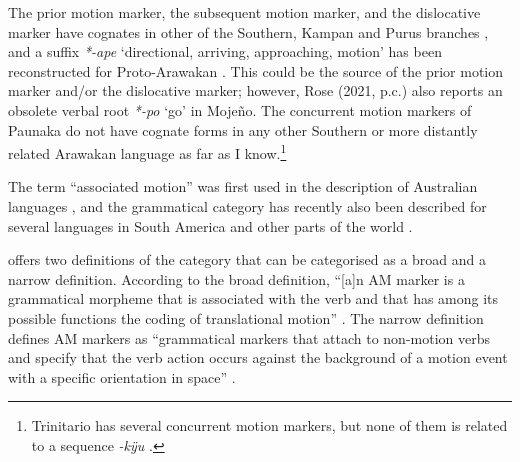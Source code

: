 \largerpage
The prior motion marker, the subsequent motion marker, and the dislocative marker have cognates in other  of the Southern, Kampan and Purus branches \citep[cf.][131--138 for an overview]{Guillaume2016}, and a suffix \mbox{\textit{*-ape}} ‘directional, arriving, approaching, motion’ has been reconstructed for Proto-Arawakan \citep[cf.][380]{Payne1991}. This could be the source of the prior motion marker and/or the dislocative marker; however, Rose (2021, p.c.) also reports an obsolete verbal root \textit{*-po} ‘go’ in Mojeño. The concurrent motion markers of Paunaka do not have cognate forms in any other Southern or more distantly related Arawakan language as far as I know.\footnote{Trinitario has several concurrent motion markers, but none of them is related to a sequence \textit{-kÿu} \citep[cf.][135]{Rose2015}.}


The term “associated motion” was first used in the description of Australian languages \citep[cf.][]{Koch1984,Wilkins1991}, and the grammatical category has recently also been described for several languages in South America \citep[e.g.][]{Guillaume2000,Guillaume2013,Guillaume2016,Fabre2013,Vuillermet2013,Rose2015} and other parts of the world \citep[e.g.][]{OConnor2007,Jacques2013}.

\citet[]{Guillaume2013,Guillaume2016} offers two definitions of the category that can be categorised as a broad and a narrow definition. According to the broad definition, “[a]n AM marker is a grammatical morpheme that is associated with the verb and that has among its possible functions the coding of translational motion” \citep[92]{Guillaume2016}. The narrow definition defines AM markers as “grammatical markers that attach to non-motion verbs and specify that the verb action occurs against the background of a motion event with a specific orientation in space” \citep[131]{Guillaume2013}.

